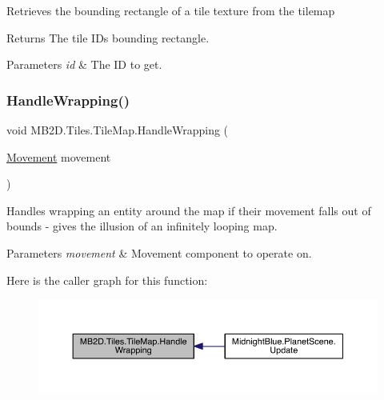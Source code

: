 Retrieves the bounding rectangle of a tile texture from the tilemap 

\begin{DoxyReturn}{Returns}
The tile ID\textquotesingle{}s bounding rectangle.
\end{DoxyReturn}

\begin{DoxyParams}{Parameters}
{\em id} & The ID to get.\\
\hline
\end{DoxyParams}
\hypertarget{class_m_b2_d_1_1_tiles_1_1_tile_map_ad00d974648e7f3070133569e5e98d261}{}\label{class_m_b2_d_1_1_tiles_1_1_tile_map_ad00d974648e7f3070133569e5e98d261} 
\subsubsection{\texorpdfstring{Handle\+Wrapping()}{HandleWrapping()}}
{\footnotesize\ttfamily void M\+B2\+D.\+Tiles.\+Tile\+Map.\+Handle\+Wrapping (\begin{DoxyParamCaption}\item[{\hyperlink{class_m_b2_d_1_1_entity_component_1_1_movement}{Movement}}]{movement }\end{DoxyParamCaption})\hspace{0.3cm}{\ttfamily [inline]}}



Handles wrapping an entity around the map if their movement falls out of bounds -\/ gives the illusion of an infinitely looping map. 


\begin{DoxyParams}{Parameters}
{\em movement} & Movement component to operate on.\\
\hline
\end{DoxyParams}
Here is the caller graph for this function\+:
\nopagebreak
\begin{figure}[H]
\begin{center}
\leavevmode
\includegraphics[width=350pt]{class_m_b2_d_1_1_tiles_1_1_tile_map_ad00d974648e7f3070133569e5e98d261_icgraph}
\end{center}
\end{figure}


